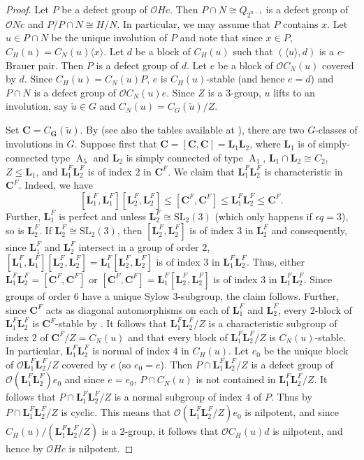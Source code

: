 \documentclass{amsart}
\theoremstyle{plain}\newtheorem{Theorem}{Theorem}[section]
\theoremstyle{plain}\newtheorem{Conjecture}[Theorem]{Conjecture}
\theoremstyle{plain}\newtheorem{Corollary}[Theorem]{Corollary}
\theoremstyle{plain}\newtheorem{Lemma}[Theorem]{Lemma}
\theoremstyle{plain}\newtheorem{Proposition}[Theorem]{Proposition}
\theoremstyle{definition}\newtheorem{Definition}[Theorem]{Definition}
\theoremstyle{definition}\newtheorem{Example}[Theorem]{Example}
\theoremstyle{definition}\newtheorem{Examples}[Theorem]{Examples}
\theoremstyle{definition}\newtheorem{Exercise}[Theorem]{Exercise}
\theoremstyle{definition}\newtheorem{Notation}[Theorem]{Notation}
\theoremstyle{definition}\newtheorem{Remark}[Theorem]{Remark}
\theoremstyle{definition}\newtheorem{Remarks}[Theorem]{Remarks}
\def\CO{{\mathcal{O}}}    \def\OPE{{\mathcal{O}(P\rtimes E)}}
\def\SL{\mathrm{SL}}
\newcommand{\bC}{{\mathbf{C}}}
\newcommand{\bG}{{\mathbf{G}}}
\newcommand{\bL}{{\mathbf{L}}}
\newcommand{\type}{\operatorname}
\numberwithin{equation}{section}
\begin{document}
\begin{proof} Let $P$ be a defect group of    $\CO Hc $.   Then $P\cap N  \cong Q_{2^{n-1}}$  is a defect group   of $\CO Nc$  and   $P/P\cap N \cong H/N$. In particular, we may assume that $P$ contains  $x $.    
  Let $u \in P\cap N$ be the unique involution  of $P$ and note  that since $x \in P$,  $C_H(u)  =  C_N(u)  \langle x\rangle $. Let $d$ be a block of $C_H(u)$  such that $(\langle u \rangle, d )$ is  a $c$-Brauer pair. Then $P$  is a defect group of $d$.  Let  $e$  be a  block of  $\CO C_N(u) $  covered by $d$.  Since  $ C_H(u) =C_N(u) P$,  $e$ is  $C_H(u)$-stable (and hence $e=d$)  and  $ P \cap  N$  is a defect group of $\CO C_N(u) e$. 
     Since $Z$   is a $3$-group,   $u$  lifts to an involution, say  $\tilde u \in G$    and  $C_N(u)  =C_G(\tilde u)/Z $.
  
 Set $\bC=C_{\bG}(\tilde u)$.  By \cite[Tab.~4.5.2]{GLS3} (see also the tables available at \cite{Luebeck}), there are two $G$-classes of involutions in $G$.
Suppose first that  $\bC= [\bC,\bC] =\bL_1 \bL_2$,  where $\bL_1 $ is of simply-connected type $\type{A}_5$ and $ \bL_2 $  is  simply connected of type $\type{A}_1$, $\bL_1 \cap \bL_2 \cong C_2$,  $ Z \leq  \bL_1$, and  $\bL_1^F\bL_2^F$ is  of index $2$ in $\bC^F$.  We claim that  $\bL_1^F\bL_2^F$ is characteristic  in $\bC^F$.  Indeed, we have $$[\bL_1^F, \bL_1^F]  [\bL_2^F, \bL_2^F] \leq [\bC^F, \bC^F] \leq \bL_1^F \bL_2^F \leq \bC^F. $$   Further, $\bL_1^F$ is perfect and unless  $\bL_2^F \cong \SL_2(3)$ (which  only happens if  $\epsilon q = 3$), so is $\bL_2^F$.  If $\bL_2^F \cong \SL_2(3)$, then $[\bL_2^F, \bL_2^F]$ is of index $3$ in $\bL_2^F$  and consequently,  since  $\bL_1^F $ and $\bL_2^F$ intersect in a group of order $2$,  $[\bL_1^F, \bL_1^F][\bL_2^F, \bL_2^F] =\bL_1^F [\bL_2^F, \bL_2^F]$ is of index $3$  in $\bL_1^F\bL_2^F$.   Thus, either  $ \bL_1^F \bL_2^F =[\bC^F, \bC^F]$ or  $[\bC^F, \bC^F]= \bL_1^F [\bL_2^F, \bL_2^F]  $ is of index $3$  in $\bL_1^F \bL_2^F$. Since groups of order $6$ have  a unique Sylow $3$-subgroup, the claim follows.  Further, since $\bC^F$ acts as  diagonal automorphisms on  each of $\bL_1^F$ and $\bL_2^F$, every $2$-block  of  $\bL_1^F\bL_2^F$  is  $\bC^F$-stable by .   It follows that $\bL_1^F\bL_2^F/Z$ is a characteristic  subgroup of  index $2$ of $\bC^F/Z=C_N(u)$ and  that every block of  $\bL_1^F \bL_2^F/Z$ is $C_N(u)$-stable. 
In particular, $\bL_1^F \bL_2^F$ is  normal  of index $4$ in $C_H(u)$. Let $e_0$ be the unique  block of  $\CO \bL_1^F \bL_2^F/Z$ covered by $e$ (so $e_0=e$). Then  $P \cap \bL_1^F \bL_2^F/Z $ is a  defect group of $\CO (\bL_1^F \bL_2^F)e_0$ and since $e=e_0$,  $P \cap  C_N(u)$ is not contained in $\bL_1^F\bL_2^F/Z$. It follows  that  $P \cap \bL_1^F \bL_2^F/Z $ is  a normal subgroup of index  $4$ of   $P$.  Thus by   $P \cap   \bL_1^F \bL_2^F/Z  $  is cyclic. This means that  $\CO (\bL_1^F \bL_2^F/Z )e_0$ is  nilpotent, and since  $C_H(u) /(\bL_1^F \bL_2^F/Z ) $ is   a  $2$-group, it follows that   $\CO C_H(u)d$ is nilpotent, and hence by  $ \CO Hc$  is  nilpotent.


\end{proof}
\end{document}
